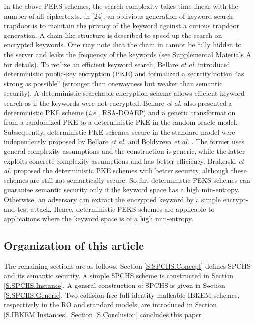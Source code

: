 \documentclass[10pt,twocolumn,twoside]{IEEEtran}
\begin{document}
In the above PEKS schemes, the search complexity takes time linear with the number of all ciphertexts. In [24],  an oblivious generation of keyword search trapdoor is to  maintain the privacy of the keyword against a curious trapdoor generation. A chain-like structure is described to speed up the search on encrypted keywords. One may note that the chain in \cite{CKRS09} cannot be fully hidden to the server and leaks the frequency of the keywords (see Supplemental Materials A for details). To realize an efficient keyword search, Bellare \emph{et al.} \cite{BBN07} introduced
deterministic public-key encryption (PKE) and formalized a security notion ``as strong as possible'' (stronger than
onewayness but weaker than semantic security). A deterministic searchable encryption scheme allows efficient keyword search as if the keywords were not
encrypted. Bellare \emph{et al.} \cite{BBN07} also presented a deterministic PKE scheme (\emph{i.e.}, RSA-DOAEP) and a
generic transformation from a randomized PKE to a deterministic PKE in the random oracle model. Subsequently,
deterministic PKE schemes secure in the standard model were independently proposed by Bellare \emph{et al.}
\cite{BFNR08} and Boldyreva \emph{et al.} \cite{BFN08}. The former uses general complexity assumptions and the
construction is generic, while the latter exploits concrete complexity assumptions and has better efficiency. Brakerski \emph{et al.} \cite{BS11} proposed the deterministic PKE schemes with better security, although these schemes are still not semantically secure. So far, deterministic PEKS schemes can guarantee semantic security only if the keyword space has a high
min-entropy. Otherwise, an adversary can extract the encrypted keyword by a simple encrypt-and-test attack. Hence, deterministic PEKS schemes are applicable to applications where the keyword space is of a high min-entropy. 

\subsection{Organization of this article}
The remaining sections are as follows. Section \ref{S.SPCHS.Concept} defines SPCHS and its semantic security. A simple SPCHS scheme is constructed in Section \ref{S.SPCHS.Instance}. A general construction of SPCHS is given in Section \ref{S.SPCHS.Generic}. Two collision-free full-identity malleable IBKEM schemes, respectively in the RO and standard models, are introduced in Section \ref{S.IBKEM.Instances}. Section \ref{S.Conclusion} concludes this paper. 
\end{document}
